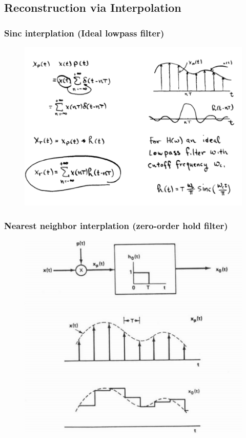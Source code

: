 \documentclass{beamer}
\begin{document}
\subsection{Reconstruction via Interpolation}
\begin{frame}
\frametitle{Sinc interplation (Ideal lowpass filter)}
\begin{figure}
\includegraphics[width=0.7\linewidth]{sample5}
\end{figure}
\end{frame}

\begin{frame}
\frametitle{Nearest neighbor interplation (zero-order hold filter)}
\begin{figure}
\includegraphics[width=0.7\linewidth]{sample6}
\end{figure}
\end{frame}
\end{document}

